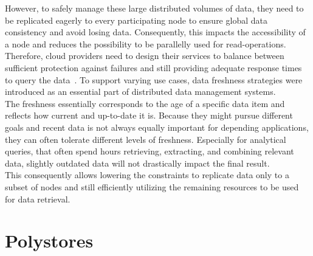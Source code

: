 However, to safely manage these large distributed volumes of data, they need to be replicated eagerly to 
every participating node to ensure global data consistency and avoid losing data. 
Consequently, this impacts the accessibility of a node and reduces the possibility to be parallelly used for read-operations.
Therefore, cloud providers need to design their services 
to balance between sufficient protection against failures and still providing adequate response times to query the data~\cite{cap2002, levandowski2013}.
To support varying use cases, data freshness strategies were introduced as an essential part of distributed data management systems.\\
The freshness essentially corresponds to the age of a specific data item and reflects how current and up-to-date it is.
Because they might pursue different goals and recent data is not always equally important for depending applications, they can often tolerate different levels of freshness.
Especially for analytical queries, that often spend hours retrieving, extracting, and combining relevant data, slightly outdated data will not drastically 
impact the final result.\\
This consequently allows lowering the constraints to replicate data only to a subset of nodes and still efficiently 
utilizing the remaining resources to be used for data retrieval.




\section{Polystores}

